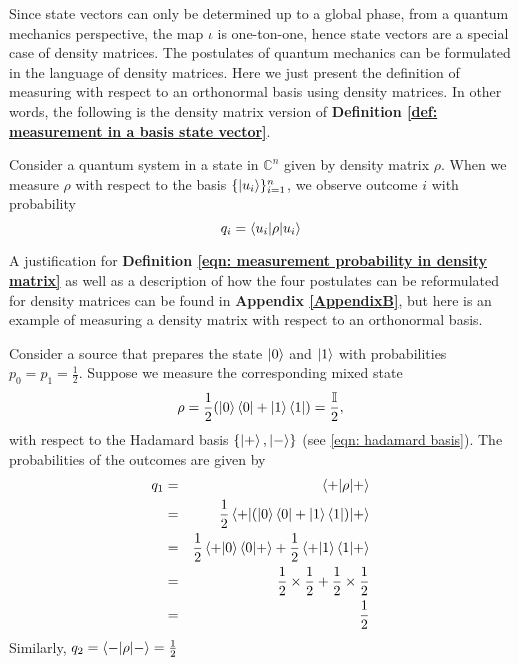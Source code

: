 Since state vectors can only be determined up to a global phase, from a quantum mechanics perspective, the map $\iota$ is one-ton-one, hence state vectors are a special case of density matrices. The postulates of quantum mechanics can be formulated in the language of density matrices. Here we just present the definition of measuring with respect to an orthonormal basis using density matrices. In other words, the following is the density matrix version of \textbf{Definition \ref{def: measurement in a basis state vector}}.


\begin{definition}
Consider a quantum system in a state in $\mathbb{C}^n$ given by density matrix $\rho$.  When we measure $\rho$ with respect to the basis $\{\ket{u_i}\}_{i=1}^n$, we observe outcome $i$ with probability 
\begin{equation} \label{eqn: measurement probability in density matrix}
    q_i=\braket{u_i | \rho |u_i}
\end{equation}
\end{definition}


A justification for \textbf{Definition \ref{eqn: measurement probability in density matrix}} as well as a description of how the four postulates can be reformulated for density matrices can be found in \textbf{Appendix \ref{AppendixB}}, but here is an example of measuring a density matrix with respect to an orthonormal basis.

\begin{example}
Consider a source that prepares the state $\ket{0}$ and $\ket{1}$ with probabilities $p_0=p_1=\frac{1}{2}$. Suppose we measure the corresponding mixed state
$$\rho=\frac{1}{2}(\ket{0}\bra{0}+\ket{1}\bra{1})=\frac{\mathbb{I}}{2},$$
with respect to the Hadamard basis $\{\ket{+}, \ket{-}\}$ (see \eqref{eqn: hadamard basis}). The probabilities of the outcomes are given by 
\begin{eqnarray}
    q_1&=&\braket{+|\rho|+}\\
    &=&\frac{1}{2}\braket{+|(\ket{0}\bra{0}+\ket{1}\bra{1})|+}\\
    &=&\frac{1}{2}\braket{+|0}\braket{0|+}+\frac{1}{2}\braket{+|1}\braket{1|+}\\
    &=&\frac{1}{2} \times \frac{1}{2} + \frac{1}{2} \times \frac{1}{2}\\
    &=&\frac{1}{2}
\end{eqnarray}
Similarly, $q_2=\braket{-|\rho|-}=\frac{1}{2}$
\end{example}


